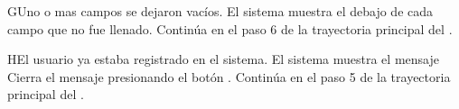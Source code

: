 \begin{UCtrayectoriaA}{G}{Uno o mas campos se dejaron vacíos.}
	\UCpaso El sistema muestra el  debajo de cada campo que no fue llenado. 
	\UCpaso	Continúa en el paso 6 de la trayectoria principal del .
\end{UCtrayectoriaA}

\begin{UCtrayectoriaA}{H}{El usuario ya estaba registrado en el sistema.}
	\UCpaso El sistema muestra el mensaje  
	\UCpaso[\UCactor] Cierra el mensaje presionando el botón .
	\UCpaso Continúa en el paso 5 de la trayectoria principal del .
\end{UCtrayectoriaA}
